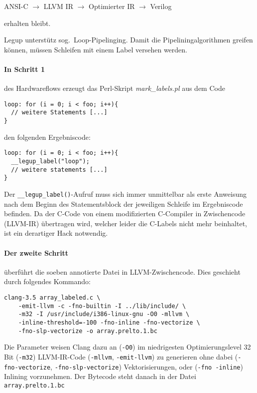 \documentclass[oneside,a4paper]{article}
\def\B#1{\lstinline[style=bash]{#1}}
\def\C#1{\lstinline[style=c]{#1}}
\begin{document}
ANSI-C \( \to \) LLVM IR \( \to \) Optimierter IR \( \to \) Verilog

erhalten bleibt.

Legup unterstütz sog.\ Loop-Pipelinging. Damit die
Pipeliningalgorithmen greifen können,
müssen Schleifen mit einem Label versehen
werden.

\paragraph{In Schritt 1} des Hardwareflows
erzeugt das Perl-Skript \emph{mark\_labels.pl}
aus dem Code
\begin{lstlisting}[style=c]
loop: for (i = 0; i < foo; i++){
  // weitere Statements [...]
}
\end{lstlisting}

den folgenden Ergebniscode:

\begin{lstlisting}[style=c]
loop: for (i = 0; i < foo; i++){
  __legup_label("loop");
  // weitere statements [...]
}
\end{lstlisting}

Der \C{__legup_label()}-Aufruf muss sich immer unmittelbar
als erste Anweisung nach dem
Beginn des Statementsblock der jeweiligen Schleife im Ergebniscode befinden.
Da der C-Code von einem modifizierten C-Compiler in Zwischencode (LLVM-IR)
übertragen wird, welcher leider die C-Labels nicht mehr beinhaltet,
ist ein derartiger Hack notwendig.

\paragraph{Der zweite Schritt} überführt die soeben annotierte Datei in
LLVM-Zwischencode. Dies geschieht durch folgendes Kommando:
\begin{lstlisting}[style=bash]
clang-3.5 array_labeled.c \
    -emit-llvm -c -fno-builtin -I ../lib/include/ \
    -m32 -I /usr/include/i386-linux-gnu -O0 -mllvm \
    -inline-threshold=-100 -fno-inline -fno-vectorize \
    -fno-slp-vectorize -o array.prelto.1.bc
\end{lstlisting}

Die Parameter weisen Clang dazu an (\B{-O0}) im niedrigesten Optimierungslevel
32 Bit (\B{-m32}) LLVM-IR-Code (\B{-mllvm}, \B{-emit-llvm}) zu generieren ohne dabei
(\B{-fno-vectorize}, \B{-fno-slp-vectorize})
Vektorisierungen, oder (\B{-fno -inline}) Inlining vorzunehmen. Der Bytecode
steht danach in der Datei \B{array.prelto.1.bc}
\end{document}
